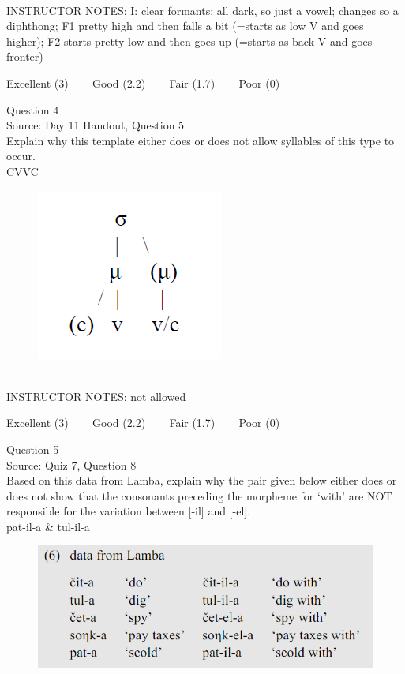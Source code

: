 \documentclass[12pt]{article}
\begin{document}
~\\
INSTRUCTOR NOTES: I: clear formants; all dark, so just a vowel; changes so a diphthong; F1 pretty high and then falls a bit (=starts as low V and goes higher); F2 starts pretty low and then goes up (=starts as back V and goes fronter)


\vfill
Excellent (3) ~~~ Good (2.2) ~~~ Fair (1.7) ~~~ Poor (0)
\newpage

{\large Question 4}\\

Source: Day 11 Handout, Question 5\\

Explain why this template either does or does not allow syllables of this type to occur.\\

CVVC

\begin{figure}[H]
\includegraphics{../images/ponapean_syllabletemplate.png}
\end{figure}

~\\
INSTRUCTOR NOTES: not allowed


\vfill
Excellent (3) ~~~ Good (2.2) ~~~ Fair (1.7) ~~~ Poor (0)
\newpage

{\large Question 5}\\

Source: Quiz 7, Question 8\\

Based on this data from Lamba, explain why the pair given below either does or does not show that the consonants preceding the morpheme for `with' are NOT responsible for the variation between [-il] and [-el].\\

pat-il-a \& tul-il-a

\begin{figure}[H]
\includegraphics{../images/peng119_lamba.png}
\end{figure}
\end{document}
